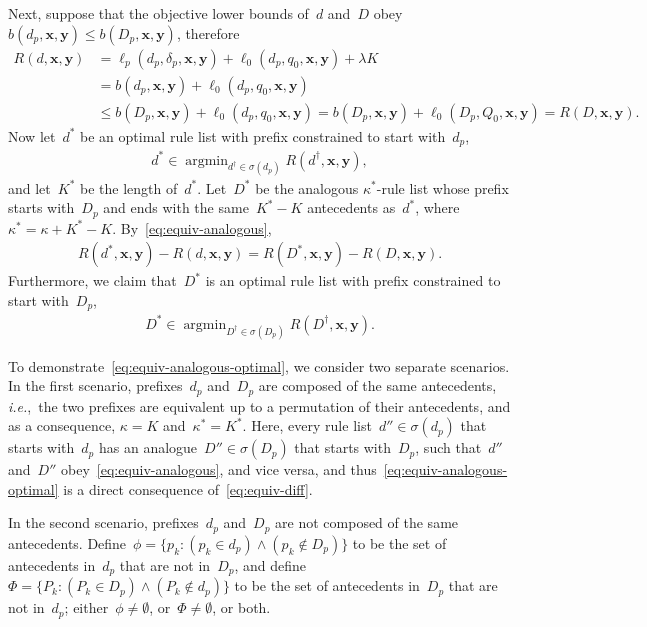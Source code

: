\documentclass[twoside,11pt]{article}
\def\ie{{\it i.e.},~}
\newcommand{\x}{\mathbf{x}}
\newcommand{\y}{\mathbf{y}}
\def\RL{{d}}
\def\Prefix{d_p}
\def\Labels{\delta_p}
\def\Default{q_0}
\def\RLB{{D}}
\def\PrefixB{D_p}
\def\DefaultB{Q_0}
\def\Obj{R}
\def\Loss{\ell}
\def\Reg{{\lambda}}
\def\StartsWith{\sigma}
\DeclareMathOperator*{\argmin}{argmin}
\newcommand{\nn}{\nonumber}
\begin{document}
Next, suppose that the objective lower bounds of~$\RL$ and~$\RLB$
obey ${b(\Prefix, \x, \y) \le b(\PrefixB, \x, \y)}$, therefore
\begin{align}
\Obj(\RL, \x, \y)
&= \Loss_p(\Prefix, \Labels, \x, \y) + \Loss_0(\Prefix, \Default, \x, \y) + \Reg K \nn \\
&= b(\Prefix, \x, \y) + \Loss_0(\Prefix, \Default, \x, \y) \nn \\
&\le b(\PrefixB, \x, \y) + \Loss_0(\Prefix, \Default, \x, \y)
= b(\PrefixB, \x, \y) + \Loss_0(\PrefixB, \DefaultB, \x, \y)
= \Obj(\RLB, \x, \y).
\label{eq:equiv-ineq}
\end{align}
Now let~$\RL^*$ be an optimal rule list with prefix
constrained to start with~$\Prefix$,
\begin{align}
\RL^* \in \argmin_{\RL^\dagger \in \StartsWith(\Prefix)} \Obj(\RL^\dagger, \x, \y), \nn
\end{align}
and let~$K^*$ be the length of~$\RL^*$.
%
Let~$\RLB^*$ be the analogous $\kappa^*$-rule list whose prefix starts
with~$\PrefixB$ and ends with the same~${K^* - K}$ antecedents as~$\RL^*$,
where~${\kappa^* = \kappa + K^* - K}$.
%
By~\eqref{eq:equiv-analogous},
\begin{align}
\Obj(\RL^*, \x, \y) - \Obj(\RL, \x, \y)
= \Obj(\RLB^*, \x, \y) - \Obj(\RLB, \x, \y).
\label{eq:equiv-diff}
\end{align}
Furthermore, we claim that~$\RLB^*$ is an optimal rule list
with prefix constrained to start with~$\PrefixB$,
\begin{align}
\RLB^* \in \argmin_{\RLB^\dagger \in \StartsWith(\PrefixB)} \Obj(\RLB^\dagger, \x, \y).
\label{eq:equiv-analogous-optimal}
\end{align}

To demonstrate~\eqref{eq:equiv-analogous-optimal},
we consider two separate scenarios.
%
In the first scenario, prefixes~$\Prefix$ and~$\PrefixB$
are composed of the same antecedents,
\ie the two prefixes are equivalent up to a permutation of
their antecedents, and as a consequence,
${\kappa = K}$ and~${\kappa^* = K^*}$.
%
Here, every rule list~${\RL'' \in \StartsWith(\Prefix)}$
that starts with~$\Prefix$
has an analogue~${\RLB'' \in \StartsWith(\PrefixB)}$
that starts with~$\PrefixB$,
such that~$\RL''$ and~$\RLB''$ obey~\eqref{eq:equiv-analogous},
and vice versa, and thus~\eqref{eq:equiv-analogous-optimal}
is a direct consequence of~\eqref{eq:equiv-diff}.

In the second scenario, prefixes~$\Prefix$ and~$\PrefixB$
are not composed of the same antecedents.
%
Define~${\phi = \{p_k : (p_k \in \Prefix) \wedge (p_k \notin \PrefixB)\}}$
to be the set of antecedents in~$\Prefix$ that are not in~$\PrefixB$,
and define~${\Phi = \{P_k : (P_k \in \PrefixB) \wedge (P_k \notin \Prefix)\}}$
to be the set of antecedents in~$\PrefixB$ that are not in~$\Prefix$;
either~${\phi \neq \emptyset}$, or~${\Phi \neq \emptyset}$, or both.
\end{document}

